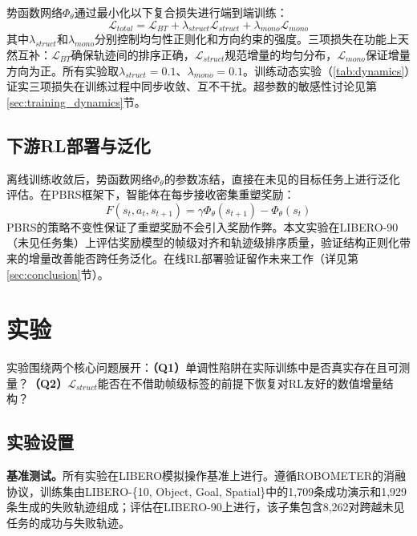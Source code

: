势函数网络$\Phi_\theta$通过最小化以下复合损失进行端到端训练：
\begin{equation}
\label{eq:total_loss}
    \mathcal{L}_{total} = \mathcal{L}_{BT} + \lambda_{struct} \mathcal{L}_{struct} + \lambda_{mono} \mathcal{L}_{mono}
\end{equation}
其中$\lambda_{struct}$和$\lambda_{mono}$分别控制均匀性正则化和方向约束的强度。三项损失在功能上天然互补：$\mathcal{L}_{BT}$确保轨迹间的排序正确，$\mathcal{L}_{struct}$规范增量的均匀分布，$\mathcal{L}_{mono}$保证增量方向为正。所有实验取$\lambda_{struct} = 0.1$、$\lambda_{mono} = 0.1$。训练动态实验（\cref{tab:dynamics}）证实三项损失在训练过程中同步收敛、互不干扰。超参数的敏感性讨论见第\ref{sec:training_dynamics}节。

\subsection{下游RL部署与泛化}

离线训练收敛后，势函数网络$\Phi_\theta$的参数冻结，直接在未见的目标任务上进行泛化评估。在PBRS框架下，智能体在每步接收密集重塑奖励：
\begin{equation}
\label{eq:deploy}
    F(s_t, a_t, s_{t+1}) = \gamma \Phi_\theta(s_{t+1}) - \Phi_\theta(s_t)
\end{equation}
PBRS的策略不变性保证了重塑奖励不会引入奖励作弊。本文实验在LIBERO-90（未见任务集）上评估奖励模型的帧级对齐和轨迹级排序质量，验证结构正则化带来的增量改善能否跨任务泛化。在线RL部署验证留作未来工作（详见第\ref{sec:conclusion}节）。



\clearpage

\section{实验}

实验围绕两个核心问题展开：\textbf{（Q1）}单调性陷阱在实际训练中是否真实存在且可测量？\textbf{（Q2）}$\mathcal{L}_{struct}$能否在不借助帧级标签的前提下恢复对RL友好的数值增量结构？

\subsection{实验设置}

\textbf{基准测试。}所有实验在LIBERO模拟操作基准\cite{liu2023libero}上进行。遵循ROBOMETER的消融协议\cite{robometer2026}，训练集由LIBERO-\{10, Object, Goal, Spatial\}中的1,709条成功演示和1,929条生成的失败轨迹组成；评估在LIBERO-90上进行，该子集包含8,262对跨越未见任务的成功与失败轨迹。

